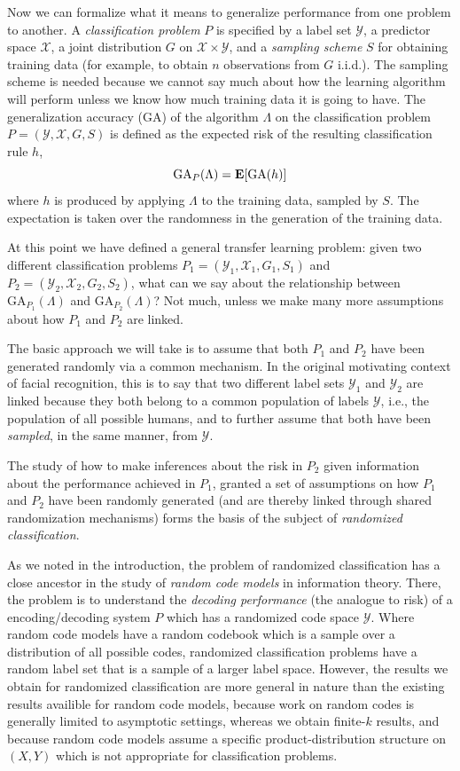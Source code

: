Now we can formalize what it means to generalize performance from one
problem to another.  A \emph{classification problem} $P$ is specified
by a label set $\mathcal{Y}$, a predictor space $\mathcal{X}$, a joint
distribution $G$ on $\mathcal{X} \times \mathcal{Y}$, and a
\emph{sampling scheme} $S$ for obtaining training data (for example,
to obtain $n$ observations from $G$ i.i.d.).  The sampling scheme is
needed because we cannot say much about how the learning algorithm
will perform unless we know how much training data it is going to
have.  The generalization accuracy (GA) of the algorithm $\Lambda$ on the
classification problem $P = (\mathcal{Y}, \mathcal{X}, G, S)$ is
defined as the expected risk of the resulting classification rule $h$,
\[
\text{GA}_P(\Lambda) = \textbf{E}[\text{GA}(h)]
\]
where $h$ is produced by applying $\Lambda$ to the training data,
sampled by $S$.  The expectation is taken over the randomness in the
generation of the training data.

At this point we have defined a general transfer learning
problem: given two different classification problems $P_1 =
(\mathcal{Y}_1, \mathcal{X}_1, G_1, S_1)$ and $P_2 = (\mathcal{Y}_2,
\mathcal{X}_2, G_2, S_2)$, what can we say about the relationship
between $\text{GA}_{P_1}(\Lambda)$ and $\text{GA}_{P_2}(\Lambda)$?
Not much, unless we make many more assumptions about how $P_1$ and
$P_2$ are linked.

The basic approach we will take is to assume that both $P_1$ and $P_2$
have been generated randomly via a common mechanism.  In the original
motivating context of facial recognition, this is to say that two
different label sets $\mathcal{Y}_1$ and $\mathcal{Y}_2$ are linked
because they both belong to a common population of labels
$\mathcal{Y}$, i.e., the population of all possible humans, and to
further assume that both have been \emph{sampled}, in the same manner,
from $\mathcal{Y}$.

The study of how to make inferences about the risk in $P_2$ given
information about the performance achieved in $P_1$, granted a set of
assumptions on how $P_1$ and $P_2$ have been randomly generated (and
are thereby linked through shared randomization mechanisms) forms the
basis of the subject of \emph{randomized classification}.

As we noted in the introduction, the problem of randomized
classification has a close ancestor in the study of \emph{random code
  models} in information theory.  There, the problem is to understand
the \emph{decoding performance} (the analogue to risk) of a
encoding/decoding system $P$ which has a randomized code space
$\mathcal{Y}$.  Where random code models have a random codebook which
is a sample over a distribution of all possible codes, randomized
classification problems have a random label set that is a sample of a
larger label space.  However, the results we obtain for randomized
classification are more general in nature than the existing results
availible for random code models, because work on random codes is
generally limited to asymptotic settings, whereas we obtain finite-$k$
results, and because random code models assume a specific
product-distribution structure on $(X, Y)$ which is not appropriate
for classification problems.

